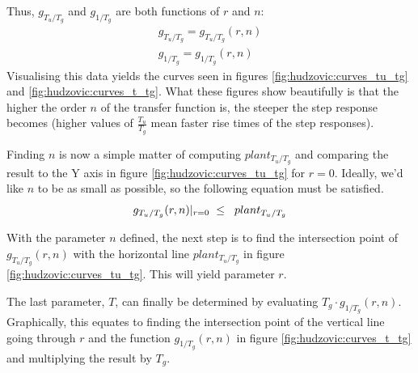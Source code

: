 Thus,  $g_{T_u/T_g}$  and  $g_{1/T_g}$  are  both  functions  of  $r$  and  $n$:
\begin{align}
    g_{T_u/T_g} = g_{T_u/T_g}(r, n) \\
    g_{1/T_g}  =  g_{1/T_g}(r,n)
\end{align}
Visualising    this    data    yields    the    curves     seen    in    figures
\ref{fig:hudzovic:curves_tu_tg}  and \ref{fig:hudzovic:curves_t_tg}. What  these
figures show beautifully  is  that  the  higher  the  order  $n$ of the transfer
function  is,  the  steeper  the  step  response  becomes   (higher   values  of
$\frac{T_u}{T_g}$   mean   faster   rise   times   of   the   step   responses).

Finding $n$ is now a simple matter of  computing $plant_{T_u/T_g}$ and comparing
the  result  to the Y axis in figure \ref{fig:hudzovic:curves_tu_tg} for  $r=0$.
Ideally, we'd  like  $n$  to  be as small as possible, so the following equation
must be satisfied.
\begin{equation}
    g_{T_u/T_g}(r, n)\lvert_{r=0} \hspace{2mm} \le \hspace{2mm} plant_{T_u/T_g}
\end{equation}

With the parameter $n$ defined, the next step is to find  the intersection point
of $g_{T_u/T_g}(r, n)$  with  the  horizontal  line  $plant_{T_u/T_g}$ in figure
\ref{fig:hudzovic:curves_tu_tg}. This will yield parameter $r$.

The last parameter, $T$,  can  finally  be  determined  by evaluating $T_g \cdot
g_{1/T_g}(r, n)$. Graphically, this equates to finding the intersection point of
the vertical line going through $r$ and the function $g_{1/T_g}(r, n)$ in figure
\ref{fig:hudzovic:curves_t_tg} and multiplying the result by $T_g$.

